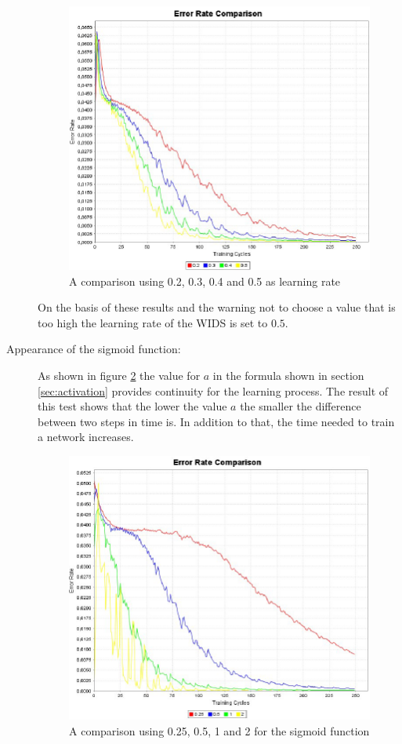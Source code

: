 \begin{description}
\begin{figure}[htbp]
	\begin{center}
		\includegraphics[width=0.7\columnwidth]{graphics/Error_learning_rates}
	\end{center}
	\vspace{-1em}
	\caption{A comparison using 0.2, 0.3, 0.4 and 0.5 as learning rate}
	\label{error_learning_rates}
\end{figure}

On the basis of these results and the warning not to choose a value that is too high the learning rate of the WIDS is set to $0.5$.

\vspace{1.5em}

	\item [Appearance of the sigmoid function:] As shown in figure \ref{error_sigmoid} the value for $a$ in the formula shown in section \ref{sec:activation} provides continuity for the learning process. The result of this test shows that the lower the value $a$ the smaller the difference between two steps in time is. In addition to that, the time needed to train a network increases.

\begin{figure}[htbp]
	\begin{center}
		\includegraphics[width=0.7\columnwidth]{graphics/Error_sigmoid}
	\end{center}
	\vspace{-1em}
	\caption{A comparison using 0.25, 0.5, 1 and 2 for the sigmoid function}
\vspace{1.5em}
	\label{error_sigmoid}
\end{figure}


\end{description}
